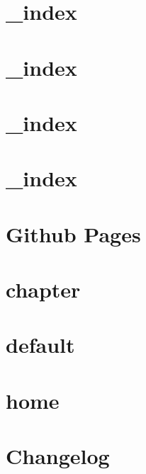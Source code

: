 \let\mypdfximage\pdfximage\def\pdfximage{\immediate\mypdfximage}\documentclass[twoside]{book}
\newcommand{\+}{\discretionary{\mbox{\scriptsize$\hookleftarrow$}}{}{}}
\begin{document}
\chapter{\+\_\+index}
\label{md_content_example_simulation__index}

\chapter{\+\_\+index}
\label{md_content_installation__index}

\chapter{\+\_\+index}
\label{md_content_q_and_a__index}

\chapter{\+\_\+index}
\label{md_content_setting__index}

\chapter{Github Pages}
\label{md_README}

\chapter{chapter}
\label{md_themes_relearn_archetypes_chapter}

\chapter{default}
\label{md_themes_relearn_archetypes_default}

\chapter{home}
\label{md_themes_relearn_archetypes_home}

\chapter{Changelog}
\label{md_themes_relearn_CHANGELOG}

\end{document}
